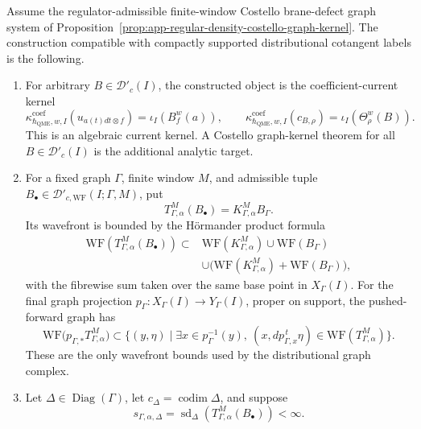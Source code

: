 \begin{prop}
\label{prop:app-current-compatible-Dprimec-graph-criterion}
  Assume the regulator-admissible finite-window Costello brane-defect
  graph system of
  Proposition~\ref{prop:app-regular-density-costello-graph-kernel}.  The
  construction compatible with compactly supported distributional
  cotangent labels is the following.
  \begin{enumerate}
    \item For arbitrary \(B\in\mathcal D'_c(I)\), the constructed object
    is the coefficient-current kernel
    \[
      \kappa^{\mathrm{coef}}_{\hbar_{\mathrm{QME}},w,I}
        (u_{a(t)dt\otimes f})=\iota_I(B^w_f(a)),
      \qquad
      \kappa^{\mathrm{coef}}_{\hbar_{\mathrm{QME}},w,I}(c_{B,\rho})
        =\iota_I(\Theta^w_\rho(B)).
    \]
    This is an algebraic current kernel.  A Costello graph-kernel theorem
    for all \(B\in\mathcal D'_c(I)\) is the additional analytic target.
    \item For a fixed graph \(\Gamma\), finite window \(M\), and
    admissible tuple
    \(B_\bullet\in\mathcal D'_{c,\mathrm{WF}}(I;\Gamma,M)\), put
    \[
      T^M_{\Gamma,\alpha}(B_\bullet)
        =K^M_{\Gamma,\alpha}B_\Gamma .
    \]
    Its wavefront is bounded by the H\"ormander product formula
    \[
    \begin{aligned}
      \mathrm{WF}\!\left(T^M_{\Gamma,\alpha}(B_\bullet)\right)
      \subset&
      \mathrm{WF}(K^M_{\Gamma,\alpha})
      \cup \mathrm{WF}(B_\Gamma)  \\
      &\cup
      \bigl(\mathrm{WF}(K^M_{\Gamma,\alpha})
        +\mathrm{WF}(B_\Gamma)\bigr),
    \end{aligned}
    \]
    with the fibrewise sum taken over the same base point in
    \(X_\Gamma(I)\).  For the final graph projection
    \(p_\Gamma:X_\Gamma(I)\to Y_\Gamma(I)\), proper on support, the
    pushed-forward graph has
    \[
      \mathrm{WF}\bigl(p_{\Gamma,*}T^M_{\Gamma,\alpha}\bigr)
      \subset
      \{(y,\eta)\mid
      \exists x\in p_\Gamma^{-1}(y),\
      (x,dp_{\Gamma,x}^{\,t}\eta)\in
      \mathrm{WF}(T^M_{\Gamma,\alpha})\}.
    \]
    These are the only wavefront bounds used by the distributional
    graph complex.
    \item Let \(\Delta\in\operatorname{Diag}(\Gamma)\), let
    \(c_\Delta=\operatorname{codim}\Delta\), and suppose
    \[
      s_{\Gamma,\alpha,\Delta}
        =\operatorname{sd}_\Delta
        \left(T^M_{\Gamma,\alpha}(B_\bullet)\right)<\infty .
    \]

\end{enumerate}
\end{prop}

